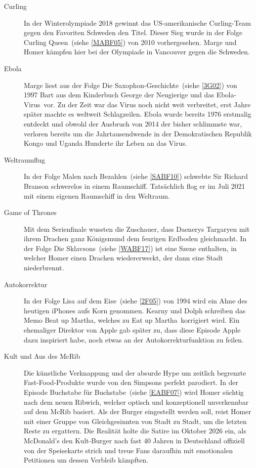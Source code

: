 \begin{appendix}
\begin{description}
  \item[Curling] In der Winterolympiade 2018 gewinnt das US-amerikanische Curling-Team gegen den Favoriten Schweden den Titel. Dieser Sieg wurde in der Folge \glqq Curling Queen\grqq\ (siehe \ref{MABF05}) von 2010 vorhergesehen. Marge und Homer kämpfen hier bei der Olympiade in Vancouver gegen die Schweden.
  \item[Ebola] Marge liest aus der Folge \glqq Die Saxophon-Geschichte\grqq\ (siehe \ref{3G02}) von 1997 Bart aus dem Kinderbuch \glqq George der Neugierige und das Ebola-Virus\grqq\ vor. Zu der Zeit war das Virus noch nicht weit verbreitet, erst Jahre später machte es weltweit Schlagzeilen. Ebola wurde bereits 1976 erstmalig entdeckt und obwohl der Ausbruch von 2014 der bisher schlimmste war, verloren bereits um die Jahrtausendwende in der Demokratischen Republik Kongo und Uganda Hunderte ihr Leben an das Virus.
  \item[Weltraumflug] In der Folge \glqq Malen nach Bezahlen\grqq\ (siehe \ref{SABF10}) schwebte Sir Richard Branson schwerelos in einem Raumschiff. Tatsächlich flog er im Juli 2021 mit einem eigenen Raumschiff in den Weltraum.
  \item[Game of Thrones] Mit dem Serienfinale wussten die Zuschauer, dass Daenerys Targaryen mit ihrem Drachen ganz Königsmund dem feurigen Erdboden gleichmacht. In der Folge \glqq Die Sklavsons\grqq\ (siehe \ref{WABF17}) ist eine Szene enthalten, in welcher Homer einen Drachen wiedererweckt, der dann eine Stadt niederbrennt.
  \item[Autokorrektur] In der Folge \glqq Lisa auf dem Eise\grqq\ (siehe \ref{2F05}) von 1994 wird ein Ahne des heutigen iPhones aufs Korn genommen. Kearny und Dolph schreiben das Memo \glqq Beat up Martha\grqq, welches zu \glqq Eat up Martha\grqq\ korrigiert wird. Ein ehemaliger Direktor von Apple gab später zu, dass diese Episode Apple dazu inspiriert habe, noch etwas an der Autokorrekturfunktion zu feilen.
  \item[Kult und Aus des McRib] Die künstliche Verknappung und der absurde Hype um zeitlich begrenzte Fast-Food-Produkte wurde von den Simpsons perfekt parodiert. In der Episode \glqq Buchstabe für Buchstabe\grqq\ (siehe \ref{EABF07}) wird Homer süchtig nach dem neuen \glqq Ribwich\grqq, welcher optisch und konzeptionell unverkennbar auf dem McRib basiert. Als der Burger eingestellt werden soll, reist Homer mit einer Gruppe von Gleichgesinnten von Stadt zu Stadt, um die letzten Reste zu ergattern. Die Realität holte die Satire im Oktober 2026 ein, als McDonald's den Kult-Burger nach fast 40 Jahren in Deutschland offiziell von der Speisekarte strich und treue Fans daraufhin mit emotionalen Petitionen um dessen Verbleib kämpften.  
\end{description}


\end{appendix}
